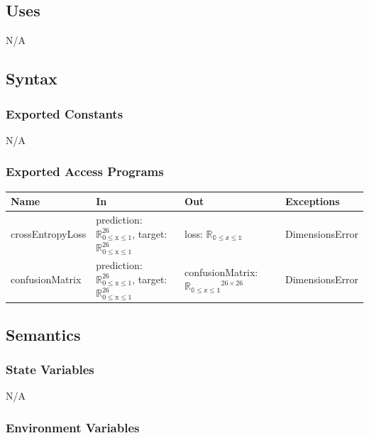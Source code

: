 \documentclass[12pt, titlepage]{article}
\begin{document}
\subsection{Uses}

N/A


\subsection{Syntax}

\subsubsection{Exported Constants}

N/A

\subsubsection{Exported Access Programs}

\begin{center}
\begin{tabular}{p{4cm} p{4cm} p{4cm} p{2cm}}
\hline
\textbf{Name} & \textbf{In} & \textbf{Out} & \textbf{Exceptions} \\
\hline
crossEntropyLoss & prediction: $\mathbb{R}_{\text{0} \leq \text{x} \leq \text{1}}^{26}$, target: $\mathbb{R}_{\text{0} \leq \text{x} \leq \text{1}}^{26}$ & loss: $\mathbb{R_{\text{0} \leq \text{x} \leq \text{1}}}$ & DimensionsError \\
confusionMatrix & prediction: $\mathbb{R}_{\text{0} \leq \text{x} \leq \text{1}}^{26}$, target: $\mathbb{R}_{\text{0} \leq \text{x} \leq \text{1}}^{26}$ & confusionMatrix: $\mathbb{R_{\text{0} \leq \text{x} \leq \text{1}}}^{26 \times 26}$ & DimensionsError \\
\hline
\end{tabular}
\end{center}

\subsection{Semantics}

\subsubsection{State Variables}

N/A

\subsubsection{Environment Variables}
\end{document}
